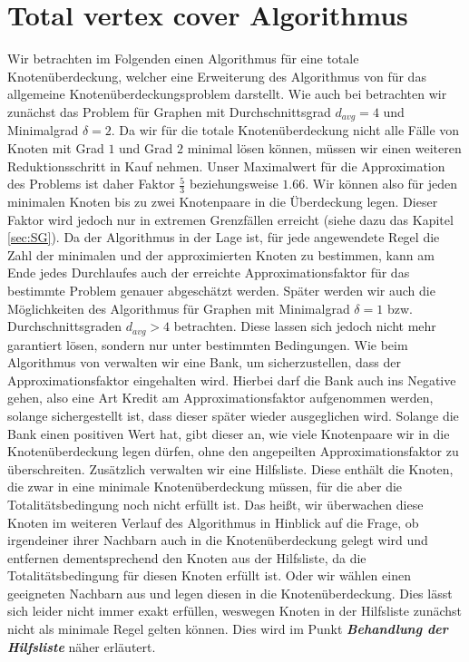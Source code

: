 \documentclass[12pt,onecolumn, notitlepage]{scrartcl}
\begin{document}
\section{Total vertex cover Algorithmus}
Wir betrachten im Folgenden einen Algorithmus für eine totale Knotenüberdeckung, welcher eine Erweiterung des Algorithmus von \cite{BraFer} für das allgemeine Knotenüberdeckungsproblem darstellt. Wie auch bei \cite{BraFer} betrachten wir zunächst das Problem für Graphen mit Durchschnittsgrad $d_{avg} = 4$ und Minimalgrad $\delta = 2$. \newline
Da wir für die totale Knotenüberdeckung nicht alle Fälle von Knoten mit Grad $1$ und Grad $2$ minimal lösen können, müssen wir einen weiteren Reduktionsschritt in Kauf nehmen. Unser Maximalwert für die Approximation des Problems ist daher Faktor $\frac{5}{3}$ beziehungsweise $1.66$. Wir können also für jeden minimalen Knoten bis zu zwei Knotenpaare in die Überdeckung legen. Dieser Faktor wird jedoch nur in extremen Grenzfällen erreicht (siehe dazu das Kapitel \ref{sec:SG}). \newline
Da der Algorithmus in der Lage ist, für jede angewendete Regel die Zahl der minimalen und der approximierten Knoten zu bestimmen, kann am Ende jedes Durchlaufes auch der erreichte Approximationsfaktor für das bestimmte Problem genauer abgeschätzt werden. \newline
Später werden wir auch die Möglichkeiten des Algorithmus für Graphen mit Minimalgrad $\delta = 1$ bzw. Durchschnittsgraden $d_{avg} > 4$ betrachten. Diese lassen sich jedoch nicht mehr garantiert lösen, sondern nur unter bestimmten Bedingungen. \newline
Wie beim Algorithmus von \cite{BraFer} verwalten wir eine Bank, um sicherzustellen, dass der Approximationsfaktor eingehalten wird. Hierbei darf die Bank auch ins Negative gehen, also eine Art Kredit am Approximationsfaktor aufgenommen werden, solange sichergestellt ist, dass dieser später wieder ausgeglichen wird. Solange die Bank einen positiven Wert hat, gibt dieser an, wie viele Knotenpaare wir in die Knotenüberdeckung legen dürfen, ohne den angepeilten Approximationsfaktor zu überschreiten.\newline
Zusätzlich verwalten wir eine Hilfsliste. Diese enthält die Knoten, die zwar in eine minimale Knotenüberdeckung müssen, für die aber die Totalitätsbedingung noch nicht erfüllt ist. Das heißt, wir überwachen diese Knoten im weiteren Verlauf des Algorithmus in Hinblick auf die Frage, ob irgendeiner ihrer Nachbarn auch in die Knotenüberdeckung gelegt wird und entfernen dementsprechend den Knoten aus der Hilfsliste, da die Totalitätsbedingung für diesen Knoten erfüllt ist. Oder wir wählen einen geeigneten Nachbarn aus und legen diesen in die Knotenüberdeckung. Dies lässt sich leider nicht immer exakt erfüllen, weswegen Knoten in der Hilfsliste zunächst nicht als minimale Regel gelten können. Dies wird im Punkt \textit{\textbf{Behandlung der Hilfsliste}} näher erläutert. \newline 
\end{document}
